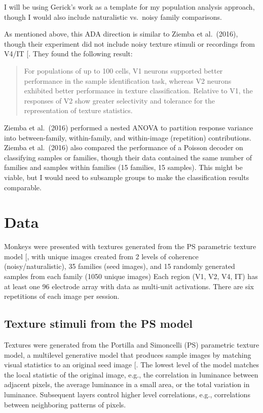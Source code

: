 \documentclass[
  11pt,
  letterpaper,
  DIV=11,
  numbers=noendperiod]{scrartcl}
\begin{document}
I will be using Gerick's work as a template for my population analysis
approach, though I would also include naturalistic vs.~noisy family
comparisons.

As mentioned above, this ADA direction is similar to Ziemba et
al.~(2016), though their experiment did not include noisy texture
stimuli or recordings from V4/IT
{[}\citeproc{ref-ziemba_selectivity_2016}{2}{]}. They found the
following result:

\begin{quote}
For populations of up to 100 cells, V1 neurons supported better
performance in the sample identification task, whereas V2 neurons
exhibited better performance in texture classification. Relative to V1,
the responses of V2 show greater selectivity and tolerance for the
representation of texture statistics.
\end{quote}

Ziemba et al.~(2016) performed a nested ANOVA to partition response
variance into between-family, within-family, and within-image
(repetition) contributions. Ziemba et al.~(2016) also compared the
performance of a Poisson decoder on classifying samples or families,
though their data contained the same number of families and samples
within families (15 families, 15 samples). This might be viable, but I
would need to subsample groups to make the classification results
comparable.

\section{Data}\label{sec-data}

Monkeys were presented with textures generated from the PS parametric
texture model {[}\citeproc{ref-portilla_parametric_2000}{7}{]}, with
unique images created from 2 levels of coherence (noisy/naturalistic),
35 families (seed images), and 15 randomly generated samples from each
family (1050 unique images) Each region (V1, V2, V4, IT) has at least
one 96 electrode array with data as multi-unit activations. There are
six repetitions of each image per session.

\subsection{Texture stimuli from the PS
model}\label{texture-stimuli-from-the-ps-model}

Textures were generated from the Portilla and Simoncelli (PS) parametric
texture model, a multilevel generative model that produces sample images
by matching visual statistics to an original seed image
{[}\citeproc{ref-portilla_parametric_2000}{7}{]}. The lowest level of
the model matches the local statistic of the original image, e.g., the
correlation in luminance between adjacent pixels, the average luminance
in a small area, or the total variation in luminance. Subsequent layers
control higher level correlations, e.g., correlations between
neighboring patterns of pixels.
\end{document}
